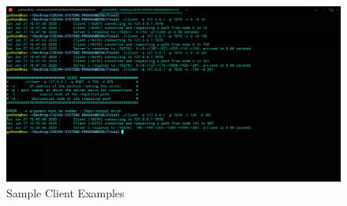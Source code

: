 \documentclass[a4paper,12pt]{report}
\begin{document}
\begin{figure}[h!]
\centering
\includegraphics[scale=0.3]{8_clientside.png}
\caption{Sample Client Examples}
\label{fig:compile}
\end{figure}
\end{document}

